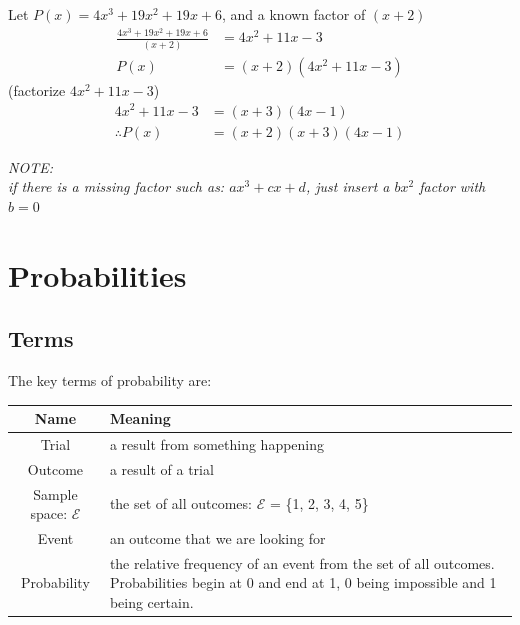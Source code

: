 \documentclass{book}
\newenvironment{note}{\begin{center}\em NOTE:\\}{\end{center}}
\begin{document}
\begin{center}
	Let $P(x) = 4x^3 + 19x^2 + 19x + 6$, and a known factor of $(x + 2)$
	\begin{align*}
		\frac{4x^3 + 19x^2 + 19x + 6}{(x + 2)} & = 4x^2 + 11x - 3          \\
		P(x)                                   & = (x + 2)(4x^2 + 11x - 3)
	\end{align*}
	(factorize $4x^2 + 11x - 3$)
	\begin{align*}
		4x^2 + 11x - 3  & = (x + 3)(4x - 1)        \\
		\therefore P(x) & = (x + 2)(x + 3)(4x - 1)
	\end{align*}
\end{center}

\begin{note}
	if there is a missing factor such as: $ax^3 + cx + d$, just insert a $bx^2$ factor with $b = 0$
\end{note}




\chapter{Probabilities}
\section{Terms}
The key terms of probability are:

\begin{center}
	\begin{tabular}{c|p{8cm}}
		Name                        & Meaning                                                                                                                                          \\ \hline
		Trial                       & a result from something happening                                                                                                                \\
		Outcome                     & a result of a trial                                                                                                                              \\
		Sample space: $\mathcal{E}$ & the set of all outcomes: $\mathcal{E}$ = \{1, 2, 3, 4, 5\}                                                                                       \\
		Event                       & an outcome that we are looking for                                                                                                               \\
		Probability                 & the relative frequency of an event from the set of all outcomes.  Probabilities begin at 0 and end at 1, 0 being impossible and 1 being certain.
	\end{tabular}
\end{center}
\end{document}
